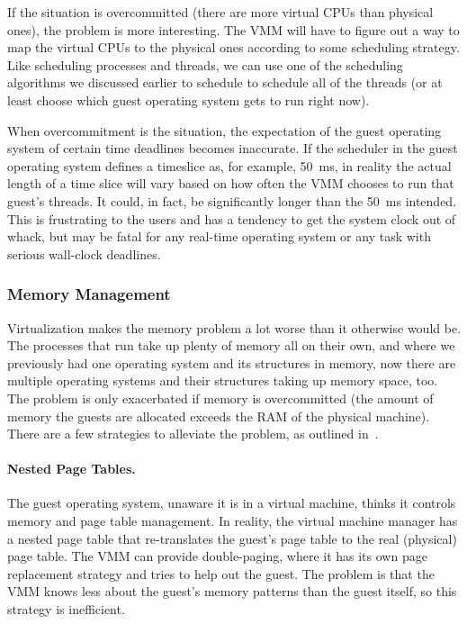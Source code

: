 If the situation is overcommitted (there are more virtual CPUs than physical ones), the problem is more interesting. The VMM will have to figure out a way to map the virtual CPUs to the physical ones according to some scheduling strategy. Like scheduling processes and threads, we can use one of the scheduling algorithms we discussed earlier to schedule to schedule all of the threads (or at least choose which guest operating system gets to run right now).

When overcommitment is the situation, the expectation of the guest operating system of certain time deadlines becomes inaccurate. If the scheduler in the guest operating system defines a timeslice as, for example, 50~ms, in reality the actual length of a time slice will vary based on how often the VMM chooses to run that guest's threads. It could, in fact, be significantly longer than the 50~ms intended. This is frustrating to the users and has a tendency to get the system clock out of whack, but may be fatal for any real-time operating system or any task with serious wall-clock deadlines.

\subsubsection*{Memory Management}

Virtualization makes the memory problem a lot worse than it otherwise would be. The processes that run take up plenty of memory all on their own, and where we previously had one operating system and its structures in memory, now there are multiple operating systems and their structures taking up memory space, too. The problem is only exacerbated if memory is overcommitted (the amount of memory the guests are allocated exceeds the RAM of the physical machine). There are a few strategies to alleviate the problem, as outlined in~\cite{osc}.

\paragraph{Nested Page Tables.} The guest operating system, unaware it is in a virtual machine, thinks it controls memory and page table management. In reality, the virtual machine manager has a nested page table that re-translates the guest's page  table to the real (physical) page table. The VMM can provide double-paging, where it has its own page replacement strategy and tries to help out the guest. The problem is that the VMM knows less about the guest's memory patterns than the guest itself, so this strategy is inefficient.

